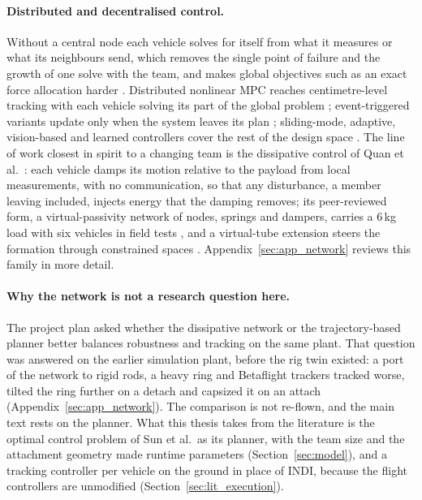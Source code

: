 \paragraph{Distributed and decentralised control.} Without a central node each vehicle solves for itself from
what it measures or what its neighbours send, which removes the single point of failure and the growth of one
solve with the team, and makes global objectives such as an exact force allocation harder
\cite{scattoliniArchitecturesDistributedHierarchical2009}. Distributed nonlinear MPC reaches centimetre-level
tracking with each vehicle solving its part of the global problem \cite{distributedNMPC}; event-triggered
variants update only when the system leaves its plan \cite{tasoojiEventTriggeredNonlinearModel,
tasoojiCooperativeControlMultiQuadrotors}; sliding-mode, adaptive, vision-based and learned controllers cover
the rest of the design space \cite{DFHSMC, arabPlanningDistributedControl2021, 9376103,
liMultiUAVCooperativeTransportation2021}. The line of work closest in spirit to a changing team is the dissipative
control of Quan et al.\ \cite{quan2025swarm}: each vehicle damps its motion relative to the payload from local
measurements, with no communication, so that any disturbance, a member leaving included, injects energy that the
damping removes; its peer-reviewed form, a virtual-passivity network of nodes, springs and dampers, carries a
6\,kg load with six vehicles in field tests \cite{liu2026passivity}, and a virtual-tube extension steers the
formation through constrained spaces \cite{liuVirtualTubeBasedCooperativeTransport2026}. Appendix~\ref{sec:app_network}
reviews this family in more detail.

\paragraph{Why the network is not a research question here.} The project plan asked whether the dissipative
network or the trajectory-based planner better balances robustness and tracking on the same plant. That question
was answered on the earlier simulation plant, before the rig twin existed: a port of the network to rigid rods, a
heavy ring and Betaflight trackers tracked worse, tilted the ring further on a detach and capsized it on an
attach (Appendix~\ref{sec:app_network}). The comparison is not re-flown, and the main text rests on the planner.
What this thesis takes from the literature is the optimal control problem of Sun et al.\ as its planner, with the
team size and the attachment geometry made runtime parameters (Section~\ref{sec:model}), and a tracking
controller per vehicle on the ground in place of INDI, because the flight controllers are unmodified
(Section~\ref{sec:lit_execution}).
